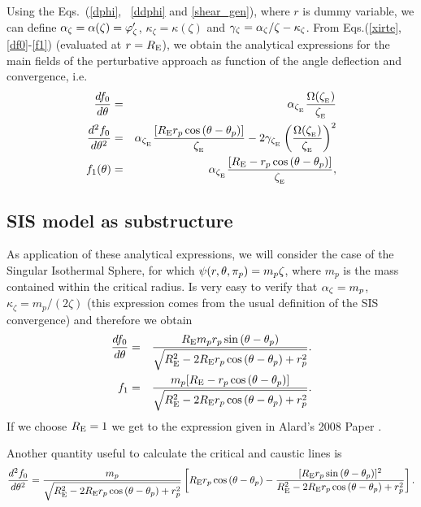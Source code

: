 Using the Eqs.~(\ref{dphi}, \, \ref{ddphi} and \ref{shear_gen}), where $r$ is dummy variable, we can define 
$\alpha_\zeta=\alpha(\zeta)=\varphi^\prime_\zeta$, $\kappa_\zeta=\kappa(\zeta)$ and $\gamma_\zeta=\alpha_\zeta/\zeta-\kappa_\zeta$. 
From Eqs.(\ref{xirte}, \ref{df0}-\ref{f1}) (evaluated at $r=R_{\mathrm{E}}$), we obtain the analytical expressions for the main fields of
the perturbative approach as function of the angle deflection and convergence, i.e.
\begin{eqnarray}
\dfrac{df_0}{d\te}&=&\al_{\xie}\dfrac{\Omega(\xie)}{\xie}\\
\dfrac{d^2f_0}{d\te^2}&=& \al_{\xie}\dfrac{[\re r_p\cos{(\te-\tep)}]}{\xie}%
- 2\gamma_{\xie} \left(\dfrac{\Omega(\xie)}{\xie}\right)^2\\
f_1(\te)&=&\al_{\xie}\dfrac{[\re-r_p\cos{(\te-\tep)}]}{\xie},
\end{eqnarray}

\subsection{SIS model as substructure}

As application of these analytical expressions, we will consider the case of the Singular Isothermal Sphere, for
which $\psi(r,\theta,\pi_p)=m_p\zeta$, where $m_p$ is the mass contained within the critical radius.
Is very easy to verify that $\alpha_\zeta=m_p$,  $\kappa_\zeta=m_p/(2\zeta)$ (this expression comes from the usual
definition of the SIS convergence) and therefore we obtain
\begin{eqnarray}
\dfrac{d f_0}{d\theta}&=&\dfrac{R_{\mathrm{E}} m_p r_p \sin{(\theta-\theta_p)}}{\sqrt{R_{\mathrm{E}}^2-2R_{\mathrm{E}} r_p\cos{(\theta-\theta_p)}+r^2_p}}.\\
f_1&=&\dfrac{m_p[R_{\mathrm{E}}-r_p\cos{(\theta-\theta_p)}]}{\sqrt{R_{\mathrm{E}}^2-2R_{\mathrm{E}} r_p\cos{(\theta-\theta_p)}+r^2_p}}.
\end{eqnarray}
If we choose $R_{\mathrm{E}}=1$ we get to the expression given in Alard's 2008 Paper .

Another quantity useful to calculate the critical and caustic lines is
\begin{equation}
\dfrac{d^2 f_0}{d\te^2}=\dfrac{m_p}{\sqrt{\re^2-2\re r_p\cos{(\te-\tep)}+r^2_p}}%
\left[\re r_p\cos{(\te-\tep)}- \dfrac{[\re r_p\sin{(\te-\tep)}]^2}{\re^2-2\re r_p\cos{(\te-\tep)}+r^2_p} \right].
\end{equation}

